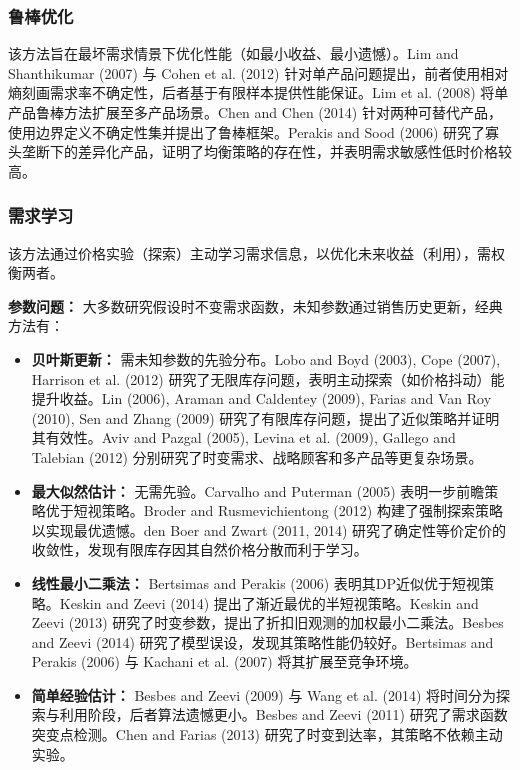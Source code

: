 \subsubsection{鲁棒优化}\label{robust-optimization-approaches}

该方法旨在最坏需求情景下优化性能（如最小收益、最小遗憾）。Lim and Shanthikumar (2007) 与 Cohen et al. (2012) 针对单产品问题提出，前者使用相对熵刻画需求率不确定性，后者基于有限样本提供性能保证。Lim et al. (2008) 将单产品鲁棒方法扩展至多产品场景。Chen and Chen (2014) 针对两种可替代产品，使用边界定义不确定性集并提出了鲁棒框架。Perakis and Sood (2006) 研究了寡头垄断下的差异化产品，证明了均衡策略的存在性，并表明需求敏感性低时价格较高。

\subsubsection{需求学习}\label{demand-learning-approaches}

该方法通过价格实验（探索）主动学习需求信息，以优化未来收益（利用），需权衡两者。

\textbf{参数问题：}
大多数研究假设时不变需求函数，未知参数通过销售历史更新，经典方法有：
\begin{itemize}
	\item \textbf{贝叶斯更新：} 需未知参数的先验分布。Lobo and Boyd (2003), Cope (2007), Harrison et al. (2012) 研究了无限库存问题，表明主动探索（如价格抖动）能提升收益。Lin (2006), Araman and Caldentey (2009), Farias and Van Roy (2010), Sen and Zhang (2009) 研究了有限库存问题，提出了近似策略并证明其有效性。Aviv and Pazgal (2005), Levina et al. (2009), Gallego and Talebian (2012) 分别研究了时变需求、战略顾客和多产品等更复杂场景。
	\item \textbf{最大似然估计：} 无需先验。Carvalho and Puterman (2005) 表明一步前瞻策略优于短视策略。Broder and Rusmevichientong (2012) 构建了强制探索策略以实现最优遗憾。den Boer and Zwart (2011, 2014) 研究了确定性等价定价的收敛性，发现有限库存因其自然价格分散而利于学习。
	\item \textbf{线性最小二乘法：} Bertsimas and Perakis (2006) 表明其DP近似优于短视策略。Keskin and Zeevi (2014) 提出了渐近最优的半短视策略。Keskin and Zeevi (2013) 研究了时变参数，提出了折扣旧观测的加权最小二乘法。Besbes and Zeevi (2014) 研究了模型误设，发现其策略性能仍较好。Bertsimas and Perakis (2006) 与 Kachani et al. (2007) 将其扩展至竞争环境。
	\item \textbf{简单经验估计：} Besbes and Zeevi (2009) 与 Wang et al. (2014) 将时间分为探索与利用阶段，后者算法遗憾更小。Besbes and Zeevi (2011) 研究了需求函数突变点检测。Chen and Farias (2013) 研究了时变到达率，其策略不依赖主动实验。
\end{itemize}

